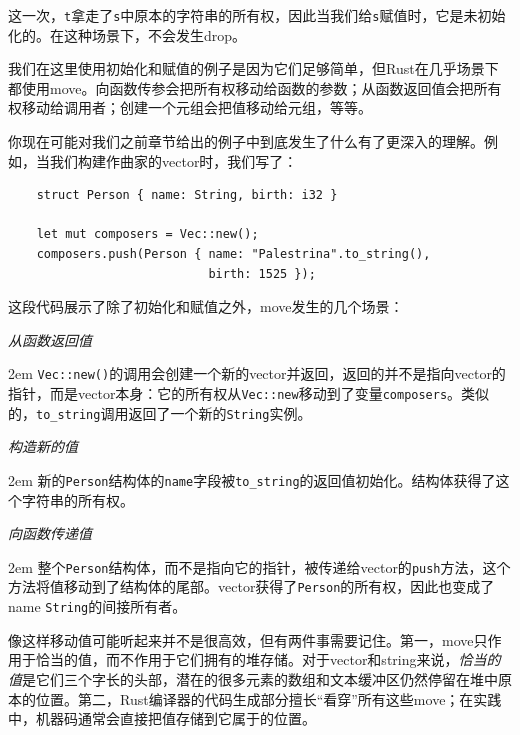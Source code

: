 这一次，\texttt{t}拿走了\texttt{s}中原本的字符串的所有权，因此当我们给\texttt{s}赋值时，它是未初始化的。在这种场景下，不会发生drop。

我们在这里使用初始化和赋值的例子是因为它们足够简单，但Rust在几乎场景下都使用move。向函数传参会把所有权移动给函数的参数；从函数返回值会把所有权移动给调用者；创建一个元组会把值移动给元组，等等。

你现在可能对我们之前章节给出的例子中到底发生了什么有了更深入的理解。例如，当我们构建作曲家的vector时，我们写了：
\begin{verbatim}
    struct Person { name: String, birth: i32 }

    let mut composers = Vec::new();
    composers.push(Person { name: "Palestrina".to_string(), 
                            birth: 1525 });
\end{verbatim}

这段代码展示了除了初始化和赋值之外，move发生的几个场景：
\begin{flushleft}
    \emph{从函数返回值}
\end{flushleft}

\hangindent 2em
\noindent
\texttt{Vec::new()}的调用会创建一个新的vector并返回，返回的并不是指向vector的指针，而是vector本身：它的所有权从\texttt{Vec::new}移动到了变量\texttt{composers}。类似的，\texttt{to\_string}调用返回了一个新的\texttt{String}实例。

\begin{flushleft}
    \emph{构造新的值}
\end{flushleft}

\hangindent 2em
\noindent
新的\texttt{Person}结构体的\texttt{name}字段被\texttt{to\_string}的返回值初始化。结构体获得了这个字符串的所有权。

\begin{flushleft}
    \emph{向函数传递值}
\end{flushleft}

\hangindent 2em
\noindent
整个\texttt{Person}结构体，而不是指向它的指针，被传递给vector的\texttt{push}方法，这个方法将值移动到了结构体的尾部。vector获得了\texttt{Person}的所有权，因此也变成了name \texttt{String}的间接所有者。

像这样移动值可能听起来并不是很高效，但有两件事需要记住。第一，move只作用于恰当的值，而不作用于它们拥有的堆存储。对于vector和string来说，\emph{恰当的值}是它们三个字长的头部，潜在的很多元素的数组和文本缓冲区仍然停留在堆中原本的位置。第二，Rust编译器的代码生成部分擅长“看穿”所有这些move；在实践中，机器码通常会直接把值存储到它属于的位置。

